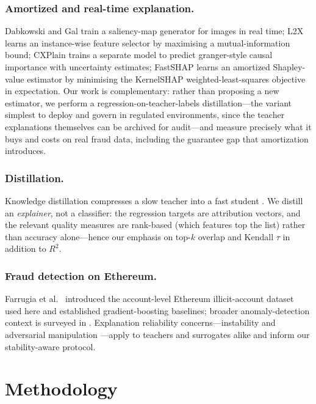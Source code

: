 \documentclass[runningheads]{llncs}
\begin{document}
\subsubsection{Amortized and real-time explanation.}
Dabkowski and Gal \cite{dabkowski2017} train a saliency-map generator for
images in real time; L2X \cite{chen2018l2x} learns an instance-wise feature
selector by maximising a mutual-information bound; CXPlain
\cite{schwab2019} trains a separate model to predict granger-style causal
importance with uncertainty estimates; FastSHAP \cite{jethani2022} learns
an amortized Shapley-value estimator by minimising the KernelSHAP
weighted-least-squares objective in expectation. Our work is complementary:
rather than proposing a new estimator, we perform a
regression-on-teacher-labels distillation---the variant simplest to deploy
and govern in regulated environments, since the teacher explanations
themselves can be archived for audit---and measure precisely what it buys
and costs on real fraud data, including the guarantee gap that
amortization introduces.

\subsubsection{Distillation.}
Knowledge distillation compresses a slow teacher into a fast student
\cite{bucilua2006,hinton2015}. We distill an \emph{explainer}, not a
classifier: the regression targets are attribution vectors, and the
relevant quality measures are rank-based (which features top the list)
rather than accuracy alone---hence our emphasis on top-$k$ overlap and
Kendall $\tau$ in addition to $R^2$.

\subsubsection{Fraud detection on Ethereum.}
Farrugia et al.\ \cite{farrugia2020} introduced the account-level Ethereum
illicit-account dataset used here and established gradient-boosting
baselines; broader anomaly-detection context is surveyed in
\cite{hilal2022}. Explanation reliability concerns---instability
\cite{alvarez2018} and adversarial manipulation \cite{slack2020}---apply to
teachers and surrogates alike and inform our stability-aware protocol.

\section{Methodology}
\label{sec:method}
\end{document}

